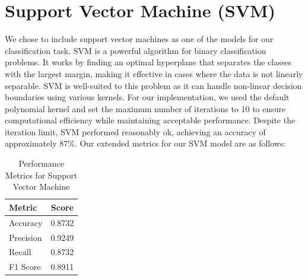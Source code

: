 \documentclass[manuscript,screen,review, nonacm]{acmart}
\begin{document}
  \section*{Support Vector Machine (SVM)}

  We chose to include support vector machines as one of the models for our 
  classification task. SVM is a powerful algorithm for binary classification problems. 
  It works by finding an optimal hyperplane that separates the classes with the largest 
  margin, making it effective in cases where the data is not linearly separable. SVM is 
  well-suited to this problem as it can handle non-linear decision boundaries using 
  various kernels. For our implementation, we used the default polynomial kernel and set the maximum number of iterations to 
  10 to ensure computational efficiency while maintaining acceptable performance. 
  Despite the iteration limit, SVM performed reasonably ok, achieving an accuracy 
  of approximately 87\%. Our extended metrics for our SVM model are as follows:

\begin{table}[H]
    \centering
    \begin{tabular}{@{}lc@{}}
        \toprule
        \textbf{Metric} & \textbf{Score} \\ \midrule
        Accuracy  & 0.8732 \\
        Precision & 0.9249 \\
        Recall    & 0.8732 \\
        F1 Score  & 0.8911 \\ \bottomrule
    \end{tabular}
    \caption{Performance Metrics for Support Vector Machine}
\end{table}
\end{document}
